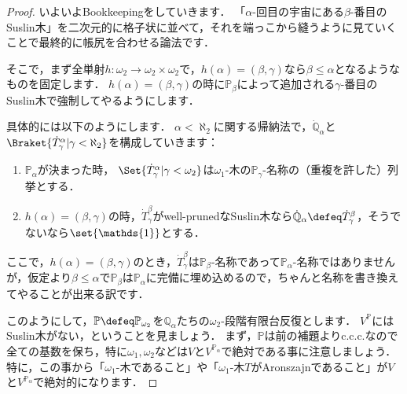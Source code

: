 \documentclass[a4j]{ltjsarticle}
\begin{document}
\begin{proof}
 いよいよBookkeepingをしていきます．
 「$\alpha$-回目の宇宙にある$\beta$-番目のSuslin木」を二次元的に格子状に並べて，それを端っこから縫うように見ていくことで最終的に帳尻を合わせる論法です．

 そこで，まず全単射$h: \omega_2 \to \omega_2 \times \omega_2$で，$h(\alpha) = (\beta, \gamma)$なら$\beta \leq \alpha$となるようなものを固定します．
 $h(\alpha) = (\beta, \gamma)$の時に$\mathbb{P}_\beta$によって追加される$\gamma$-番目のSuslin木で強制してやるようにします．
 
 具体的には以下のようにします．
 $\alpha < \aleph_2$に関する帰納法で，$\dot{\mathbb{Q}}_\alpha$と$\Braket{\dot{T}^\alpha_\gamma | \gamma < \aleph_2}$を構成していきます：
 \begin{enumerate}
  \item $\mathbb{P}_\alpha$が決まった時，
        $\Set{\dot{T}^\alpha_\gamma | \gamma < \omega_2}$は$\omega_1$-木の$\mathbb{P}_\gamma$-名称の（重複を許した）列挙とする．
  \item $h(\alpha) = (\beta, \gamma)$の時，$\dot{T}^\beta_\gamma$がwell-prunedなSuslin木なら$\dot{\mathbb{Q}}_\alpha \defeq \dot{T}^\beta_\gamma$，そうでないなら$\set{\mathds{1}}$とする．
 \end{enumerate}
 ここで，$h(\alpha) = (\beta, \gamma)$のとき，$\dot{T}^\beta_\gamma$は$\mathbb{P}_\beta$-名称であって$\mathbb{P}_\alpha$-名称ではありませんが，仮定より$\beta \leq \alpha$で$\mathbb{P}_\beta$は$\mathbb{P}_\alpha$に完備に埋め込めるので，ちゃんと名称を書き換えてやることが出来る訳です．

 このようにして，$\mathbb{P} \defeq \mathbb{P}_{\omega_2}$を$\mathbb{Q}_\alpha$たちの$\omega_2$-段階有限台反復とします．
 $V^{\mathbb{P}}$にはSuslin木がない，ということを見ましょう．
 まず，$\mathbb{P}$は前の補題よりc.c.c.なので全ての基数を保ち，特に$\omega_1, \omega_2$などは$V$と$V^{\mathbb{P}_\alpha}$で絶対である事に注意しましょう．
 特に，この事から「$\omega_1$-木であること」や「$\omega_1$-木$T$がAronszajnであること」が$V$と$V^{\mathbb{P}_\alpha}$で絶対的になります．


\end{proof}
\end{document}
